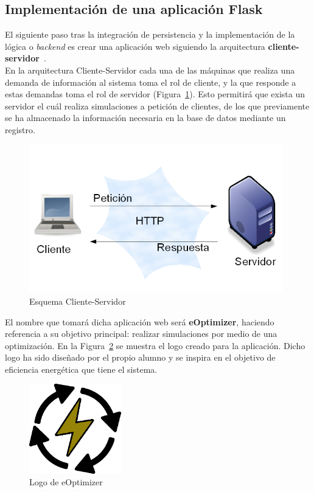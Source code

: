 \subsection{Implementación de una aplicación Flask}
El siguiente paso tras la integración de persistencia y la implementación de la lógica o \textit{backend} es crear una aplicación web siguiendo la arquitectura \textbf{cliente-servidor}~\cite{Goer04}.\\

En la arquitectura Cliente-Servidor cada una de las máquinas que realiza una demanda de información al sistema toma el rol de cliente, y la que responde a estas demandas toma el rol de servidor (Figura~\ref{fig:client-server}). Esto permitirá que exista un servidor el cuál realiza simulaciones a petición de clientes, de los que previamente se ha almacenado la información necesaria en la base de datos mediante un registro.
\begin{figure}[H]
            \centering
            \includegraphics[width=11cm]{figs/client-server.png}
            \caption{Esquema Cliente-Servidor}
            \label{fig:client-server}
\end{figure}

El nombre que tomará dicha aplicación web será \textbf{eOptimizer}, haciendo referencia a su objetivo principal: realizar simulaciones por medio de una optimización. En la Figura~\ref{fig:logo} se muestra el logo creado para la aplicación. Dicho logo ha sido diseñado por el propio alumno y se inspira en el objetivo de eficiencia energética que tiene el sistema.
\begin{figure}[H]
            \centering
            \includegraphics[width=4cm]{figs/logo.png}
            \caption{Logo de eOptimizer}
            \label{fig:logo}
\end{figure}

